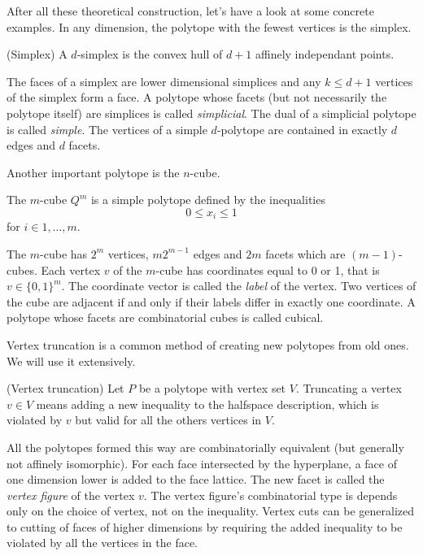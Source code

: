After all these theoretical construction, let's have a look at some concrete examples.
In any dimension, the polytope with the fewest vertices is the simplex. 
\begin{definition}
 (Simplex) A $d$-simplex is the convex hull of $d+1$ affinely independant 
points.
\end{definition}
The faces of a simplex are lower dimensional simplices and any $k\le d+1$ vertices
of the simplex form a face. 
 A polytope whose facets 
(but not necessarily the polytope itself) are simplices is called 
\textit{simplicial}. The dual of a simplicial polytope is called 
\textit{simple}. The vertices of a simple $d$-polytope are contained in exactly 
$d$ edges and $d$ facets. 

Another important polytope is the $n$-cube.

\begin{definition}
 The $m$-cube $Q^m$ is a simple polytope defined by the inequalities
\begin{equation}
 0 \leq x_i \leq 1 
\end{equation}
for $i \in 1,\dots, m$.
\end{definition}
The $m$-cube has $2^m$ vertices, $m2^{m-1}$ edges and $2m$ facets which
are $(m-1)$-cubes. Each vertex $v$ of the $m$-cube has coordinates equal to 0 
or 1, that is $v\in \{0,1\}^m$. The coordinate vector is called the 
\textit{label} of the vertex. Two vertices of the cube are adjacent if and only 
if their labels differ in exactly one coordinate. A polytope whose facets are combinatorial cubes
is called cubical.


Vertex truncation is a common method of creating new polytopes from old ones.
We will use it extensively.
\begin{definition}
(Vertex truncation) Let $P$ be a polytope with vertex set $V$. Truncating a vertex $v \in V$ means adding
a new inequality to the halfspace description, which is violated by $v$ but valid for all the others vertices in $V$.
\end{definition}
All the polytopes formed this way are combinatorially equivalent (but generally not affinely isomorphic). 
For each face intersected by the hyperplane, 
a face of one dimension lower is added to the face lattice. The new facet is 
called the \textit{vertex figure} of the vertex $v$. The vertex figure's combinatorial type 
is depends only on the choice of vertex, not on the inequality. Vertex cuts can be generalized to cutting of 
faces of higher dimensions by requiring the added inequality to be violated by 
all the vertices in the face. 

